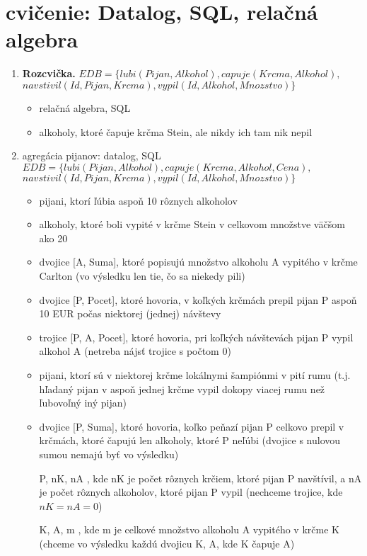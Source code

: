 \documentclass[10pt, a4paper]{article}
\begin{document}
\section{cvičenie: Datalog, SQL, relačná algebra}

\begin{enumerate}
\item {\bf Rozcvička.} $EDB=\{lubi(Pijan, Alkohol), capuje(Krcma, Alkohol),$\\
\hspace*{1cm} $navstivil(Id, Pijan, Krcma), vypil(Id, Alkohol, Mnozstvo)\}$
\begin{itemize}
    \item relačná algebra, SQL
    \item alkoholy, ktoré čapuje krčma Stein, ale nikdy ich tam nik nepil
\end{itemize}

\item agregácia pijanov: datalog, SQL
$EDB=\{lubi(Pijan, Alkohol), capuje(Krcma, Alkohol, Cena),$\\
\hspace*{1cm} $navstivil(Id, Pijan, Krcma), vypil(Id, Alkohol, Mnozstvo)\}$
\begin{itemize}
    \item pijani, ktorí ľúbia aspoň 10 rôznych alkoholov
    \item alkoholy, ktoré boli vypité v krčme Stein v celkovom množstve väčšom ako 20
    \item dvojice [A, Suma], ktoré popisujú množstvo alkoholu A vypitého v krčme Carlton (vo výsledku len tie, čo sa niekedy pili)
    \item dvojice [P, Pocet], ktoré hovoria, v koľkých krčmách prepil pijan P aspoň 10 EUR počas niektorej (jednej) návštevy
    \item trojice [P, A, Pocet], ktoré hovoria, pri koľkých návštevách pijan P vypil alkohol A (netreba nájsť trojice s počtom 0)
    \item pijani, ktorí sú v niektorej krčme lokálnymi šampiónmi v pití rumu (t.j. hľadaný pijan v aspoň jednej krčme vypil dokopy viacej rumu než ľubovoľný iný pijan)
    \item dvojice [P, Suma], ktoré hovoria, koľko peňazí pijan P celkovo prepil v krčmách, ktoré čapujú len alkoholy, ktoré P neľúbi (dvojice s nulovou sumou nemajú byť vo výsledku)
    \item [P, nK, nA], kde nK je počet rôznych krčiem, ktoré pijan P navštívil, a nA je počet rôznych alkoholov, ktoré pijan P vypil (nechceme trojice, kde $nK=nA=0$) 
    \item [K, A, m], kde m je celkové množstvo alkoholu A vypitého v krčme K (chceme vo výsledku každú dvojicu K, A, kde K čapuje A)
\end{itemize}


\end{enumerate}
\end{document}
